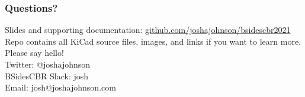 \documentclass[aspectratio=169, t]{beamer}
\begin{document}
\begin{frame}
\frametitle{Questions?}
Slides and supporting documentation: \url{github.com/joshajohnson/bsidescbr2021}\\[10pt]
Repo contains all KiCad source files, images, and links if you want to learn more.\\[10pt]
Please say hello!\\[10pt]

Twitter: @\textunderscore joshajohnson\\
BSidesCBR Slack: josh\\
Email: josh@joshajohnson.com\\
\end{frame}
\end{document}
